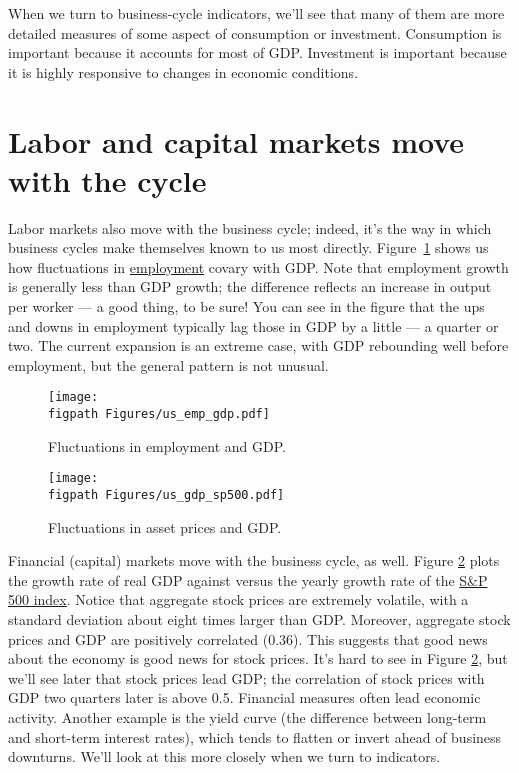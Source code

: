 When we turn to 
business-cycle indicators, we'll see that
many of them are more detailed measures of
some aspect of consumption or investment.
Consumption is important because it accounts for most of GDP.
Investment is important because it is highly responsive
to changes in economic conditions.


\section{Labor and capital markets move with the cycle}

Labor markets also move with the business cycle;
indeed, it's the way in which business cycles make themselves
known to us most directly.
Figure~\ref{fig:labor} shows us how fluctuations in
\href{http://research.stlouisfed.org/fred2/series/PAYEMS}{employment}
covary with GDP.
Note that employment growth is generally less than GDP growth;
the difference reflects an increase in output per worker --- a good thing, to be sure!
You can see in the figure that the ups and downs in employment
typically lag those in GDP by a little --- a quarter or two.
The current expansion is an extreme case, with
GDP rebounding well before employment,
but the general pattern is not unusual.

\begin{figure}[!ht]
\caption{Fluctuations in employment and GDP.}
    \label{fig:labor}%
    \centering
    \texttt{[image: \\figpath Figures/us\_emp\_gdp.pdf]}
\end{figure}

\begin{figure}[!ht]
    \caption{Fluctuations in asset prices and GDP.}
    \label{fig:stock}%
    \centering
    \texttt{[image: \\figpath Figures/us\_gdp\_sp500.pdf]}
\end{figure}

Financial (capital) markets move with the business cycle, as well. Figure \ref{fig:stock} plots the growth rate of real GDP against versus the yearly growth rate of the \href{http://research.stlouisfed.org/fred2/series/SP500}{S\&P 500 index}. Notice that aggregate stock prices are extremely volatile, with a standard deviation about eight times larger than GDP. Moreover, aggregate stock prices and GDP are positively correlated (0.36). This suggests that good news about the economy is good news for stock prices.
It's hard to see in Figure \ref{fig:stock},
but we'll see later that stock prices lead GDP;
the correlation of stock prices with GDP two quarters later is above 0.5. Financial
measures often lead economic activity. Another example is the yield 
 curve (the difference
between long-term and short-term interest rates),
which tends to flatten or invert ahead of business downturns.
We'll look at this more closely when we turn to indicators.


